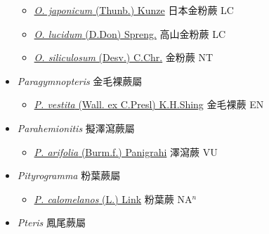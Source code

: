 \begin{itemize}
  \begin{itemize}
        \item[] \href{http://www.theplantlist.org/tpl1.1/search?q=Onychium+japonicum}{\textit{O. japonicum} (Thunb.) Kunze}   日本金粉蕨 LC
        \item[] \href{http://www.theplantlist.org/tpl1.1/search?q=Onychium+lucidum}{\textit{O. lucidum} (D.Don) Spreng.}     高山金粉蕨 LC
        \item[] \href{http://www.theplantlist.org/tpl1.1/search?q=Onychium+siliculosum}{\textit{O. siliculosum} (Desv.) C.Chr.}   金粉蕨 NT
  \end{itemize}
 \item[] \textit{Paragymnopteris} 金毛裸蕨屬
                    
  \begin{itemize}
        \item[] \href{http://www.theplantlist.org/tpl1.1/search?q=Paragymnopteris+vestita}{\textit{P. vestita} (Wall. ex C.Presl) K.H.Shing}   金毛裸蕨 EN
  \end{itemize}
 \item[] \textit{Parahemionitis} 擬澤瀉蕨屬
                    
  \begin{itemize}
        \item[] \href{http://www.theplantlist.org/tpl1.1/search?q=Parahemionitis+arifolia}{\textit{P. arifolia} (Burm.f.) Panigrahi}   澤瀉蕨 VU
  \end{itemize}
 \item[] \textit{Pityrogramma} 粉葉蕨屬
                    
  \begin{itemize}
        \item[] \href{http://www.theplantlist.org/tpl1.1/search?q=Pityrogramma+calomelanos}{\textit{P. calomelanos} (L.) Link}   粉葉蕨 NA$^n$
  \end{itemize}
 \item[] \textit{Pteris} 鳳尾蕨屬
                    

\end{itemize}
